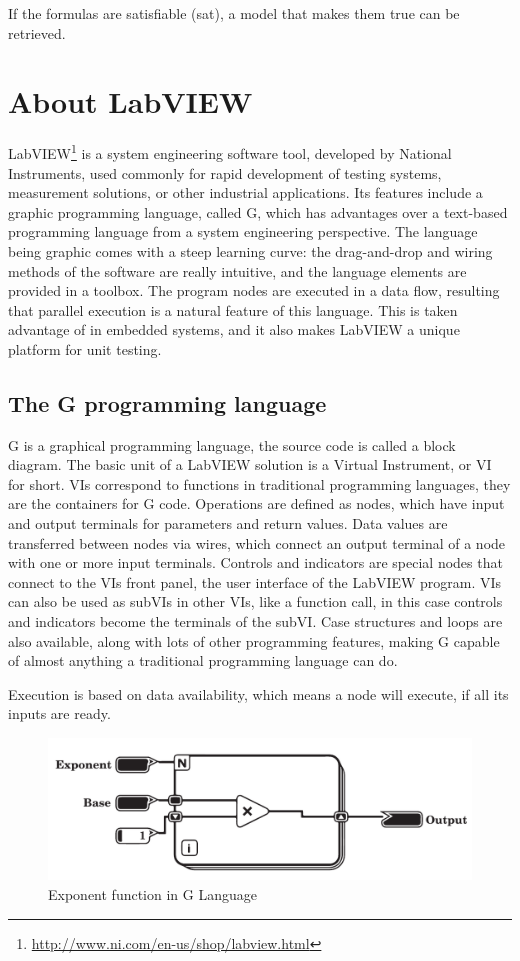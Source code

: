 If the formulas are satisfiable (sat), a model that makes them true can be retrieved. \cite{z3_tutorial}
\section{About LabVIEW}
LabVIEW\footnote{\url{http://www.ni.com/en-us/shop/labview.html}} is a system engineering software tool, developed by National Instruments, used commonly for rapid development of testing systems, measurement solutions, or other industrial applications. Its features include a graphic programming language, called G, which has advantages over a text-based programming language from a system engineering perspective. The language being graphic comes with a steep learning curve: the drag-and-drop and wiring methods of the software are really intuitive, and the language elements are provided in a toolbox. The program nodes are executed in a data flow, resulting that parallel execution is a natural feature of this language. This is taken advantage of in embedded systems, and it also makes LabVIEW a unique platform for unit testing.
\subsection{The G programming language}
G is a graphical programming language, the source code is called a block diagram. The basic unit of a LabVIEW solution is a Virtual Instrument, or VI for short. VIs correspond to functions in traditional programming languages, they are the containers for G code. Operations are defined as nodes, which have input and output terminals for parameters and return values. Data values are transferred between nodes via wires, which connect an output terminal of a node with one or more input terminals. Controls and indicators are special nodes that connect to the VIs front panel, the user interface of the LabVIEW program. VIs can also be used as subVIs in other VIs, like a function call, in this case controls and indicators become the terminals of the subVI. Case structures and loops are also available, along with lots of other programming features, making G capable of almost anything a traditional programming language can do.

Execution is based on data availability, which means a node will execute, if all its inputs are ready. 
\begin{figure}

\includegraphics[width=150mm,keepaspectratio]{figures/vi2.pdf}
\caption{Exponent function in G Language} 
\label{fig:gexponent}
\end{figure}

